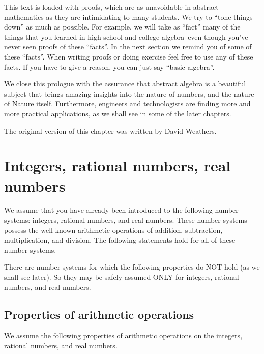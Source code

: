 This text is loaded with proofs, which are as unavoidable in abstract mathematics as they are intimidating to many students. We try to ``tone things down'' as much as possible. For example, we will take as ``fact'' many of the things that you learned in high school and  college algebra--even though you've never seen proofs of these ``facts''.  In the next section  we remind you of some of these ``facts''.  When writing proofs or doing exercise feel free to use any of these facts.  If you have to give a reason, you can just say  ``basic algebra''.

We close this prologue with the assurance that abstract algebra is a beautiful subject that brings amazing insights into the nature of numbers, and the nature of Nature itself. Furthermore, engineers and technologists are finding more and more practical applications, as we shall see in some of the later chapters.

The original version of this chapter was written by David Weathers. 

\section{Integers, rational numbers, real numbers}



We assume that you have already been introduced to the following number systems: integers, rational numbers, and real numbers.  These number systems possess the well-known arithmetic operations of addition, subtraction, multiplication, and division. The following statements hold for all of these number systems. 

\begin{warn}
There are number systems for which the following properties do NOT hold (as we shall see later). So they may be safely assumed ONLY for integers, rational numbers, and real numbers.
\end{warn}

\subsection{Properties of arithmetic operations}\label{OpsAndRels}

We assume the following properties of arithmetic operations on the integers, rational numbers, and real numbers.

